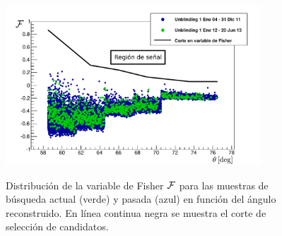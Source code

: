 	\begin{figure}[ht!]
		\begin{center}
			\includegraphics[width=0.85\textwidth]{fig/resultadosAuger/DGL_Unblinding_Thesis}\\
			\caption{\label{fig:unblindingDGL}
			Distribuci\'on de la variable de Fisher $\cal F$ para las muestras de b\'usqueda actual (verde) y pasada (azul) en funci\'on del \'angulo reconstruido. 
			En l\'inea continua negra se muestra el corte de selecci\'on de candidatos.
			}
		\end{center}
	\end{figure}
	
	
